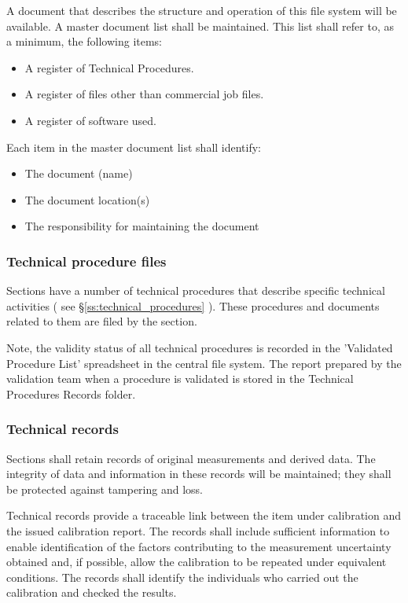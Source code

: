 A document that describes the structure and operation of this file system will be available. A master document list shall be maintained. This list shall refer to, as a minimum, the following items: 
\begin{itemize}
\item A register of Technical Procedures. 
\item A register of files other than commercial job files. 
\item A register of software used. 
\end{itemize}
Each item in the master document list shall identify:
\begin{itemize}
\item The document (name) 
\item The document location(s) 
\item The responsibility for maintaining the document
\end{itemize}

\subsubsection{Technical procedure files}
Sections have a number of technical procedures that describe specific technical activities ( see \S\ref{ss:technical_procedures} ). These procedures and documents related to them are filed by the section.
 
Note, the validity status of all technical procedures is recorded in the 'Validated Procedure List' spreadsheet in the central file system. The report prepared by the validation team when a procedure is validated is stored in the Technical Procedures Records folder.

\subsubsection{Technical records}
Sections shall retain records of original measurements and derived data. The integrity of data and information in these records will be maintained; they shall be protected against tampering and loss.

Technical records provide a traceable link between the item under calibration and the issued calibration report. The records shall include sufficient information to enable identification of the factors contributing to the measurement uncertainty obtained and, if possible, allow the calibration to be repeated under equivalent conditions. The records shall identify the individuals who carried out the calibration and checked the results. 

